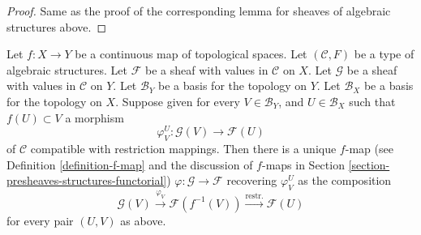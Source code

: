 \begin{proof}
Same as the proof of the corresponding lemma
for sheaves of algebraic structures above.
\end{proof}

\begin{lemma}
\label{lemma-f-map-basis-above-and-below-structures}
Let $f : X \to Y$ be a continuous map of topological spaces.
Let $(\mathcal{C}, F)$ be a type of algebraic structures.
Let $\mathcal{F}$ be a sheaf with values in $\mathcal{C}$ on $X$.
Let $\mathcal{G}$ be a sheaf with values in $\mathcal{C}$ on $Y$.
Let $\mathcal{B}_Y$ be a basis for the topology on $Y$.
Let $\mathcal{B}_X$ be a basis for the topology on $X$.
Suppose given for every $V \in \mathcal{B}_Y$, and
$U \in \mathcal{B}_X$ such that $f(U) \subset V$ a morphism
$$
\varphi_V^U :
\mathcal{G}(V)
\longrightarrow
\mathcal{F}(U)
$$
of $\mathcal{C}$ compatible with restriction mappings.
Then there is a unique $f$-map (see
Definition \ref{definition-f-map} and the discussion
of $f$-maps in Section \ref{section-presheaves-structures-functorial})
$\varphi : \mathcal{G} \to \mathcal{F}$
recovering $\varphi_V^U$ as the composition
$$
\mathcal{G}(V) \xrightarrow{\varphi_V}
\mathcal{F}(f^{-1}(V)) \xrightarrow{\text{restr.}}
\mathcal{F}(U)
$$
for every pair $(U, V)$ as above.
\end{lemma}

